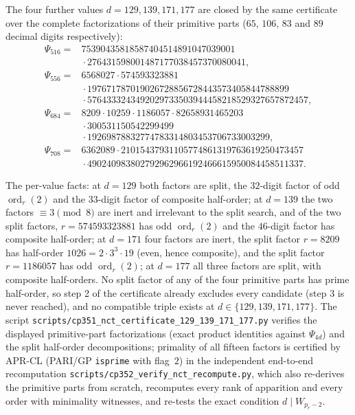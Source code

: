 \documentclass[11pt]{amsart}
\theoremstyle{plain}
\theoremstyle{definition}
\theoremstyle{remark}
\numberwithin{equation}{section}
\newcommand{\ord}{\operatorname{ord}}
\begin{document}
The four further values $d=129,139,171,177$ are closed by the same certificate over the complete factorizations of their primitive parts ($65$, $106$, $83$ and $89$ decimal digits respectively):
\[
\begin{aligned}
  \Psi_{516}={}&
  75390435818587404514891047039001\\
  &{}\cdot276431598001487177038457370080041,\\[2pt]
  \Psi_{556}={}&
  6568027\cdot574593323881\\
  &{}\cdot197671787019026728856728443573405844788899\\
  &{}\cdot5764333243492029733503944458218529327657872457,\\[2pt]
  \Psi_{684}={}&
  8209\cdot10259\cdot1186057\cdot82658931465203\\
  &{}\cdot300531150542299499\\
  &{}\cdot19269878832774783314803453706733003299,\\[2pt]
  \Psi_{708}={}&
  6362089\cdot21015437931105774861319763619250473457\\
  &{}\cdot490240983802792962966192466615950084458511337.
\end{aligned}
\]
{\sloppy
The per-value facts: at $d=129$ both factors are split, the $32$-digit factor of odd $\ord_r(2)$ and the $33$-digit factor of composite half-order; at $d=139$ the two factors $\equiv3\pmod8$ are inert and irrelevant to the split search, and of the two split factors, $r=574593323881$ has odd $\ord_r(2)$ and the $46$-digit factor has composite half-order; at $d=171$ four factors are inert, the split factor $r=8209$ has half-order $1026=2\cdot3^3\cdot19$ (even, hence composite), and the split factor $r=1186057$ has odd $\ord_r(2)$; at $d=177$ all three factors are split, with composite half-orders. No split factor of any of the four primitive parts has prime half-order, so step 2 of the certificate already excludes every candidate (step 3 is never reached), and no compatible triple exists at $d\in\{129,139,171,177\}$. The script \texttt{scripts/}\allowbreak\texttt{cp351\_nct\_certificate\_129\_139\_171\_177.py} verifies the displayed primitive-part factorizations (exact product identities against $\Psi_{4d}$) and the split half-order decompositions; primality of all fifteen factors is certified by APR-CL (PARI/GP \texttt{isprime} with flag~$2$) in the independent end-to-end recomputation \texttt{scripts/}\allowbreak\texttt{cp352\_verify\_nct\_recompute.py}, which also re-derives the primitive parts from scratch, recomputes every rank of apparition and every order with minimality witnesses, and re-tests the exact condition $d\mid W_{p_r-2}$.\par}
\end{document}
